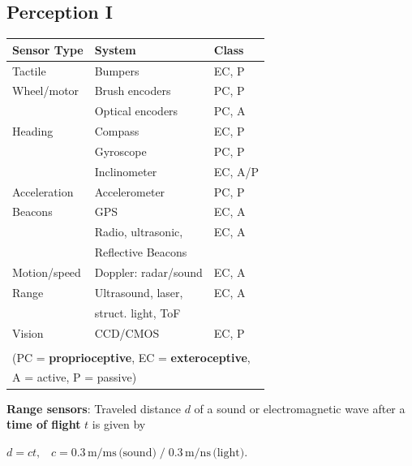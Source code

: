 \documentclass[landscape]{article}
\newcommand{\vmspace}{\vspace{-7pt}}
\newcommand{\vpspace}{\vspace{5pt}}
\newcommand{\vtspace}{\vspace{-10pt}}
\begin{document}
\begin{multicols}{3}
\vtspace

\section{Perception I}
\vmspace

\begin{minipage}{\columnwidth}
  \begin{center}
    \begin{tabular}{lll}\toprule
      \textbf{Sensor Type} & \textbf{System} & \textbf{Class} \\\hline
      Tactile & Bumpers & EC, P \\
      Wheel/motor & Brush encoders & PC, P \\
      & Optical encoders & PC, A \\
      Heading & Compass & EC, P \\
      & Gyroscope & PC, P \\
      & Inclinometer & EC, A/P \\
      Acceleration & Accelerometer & PC, P \\
      Beacons & GPS & EC, A \\
              & Radio, ultrasonic, & EC, A \\
              & Reflective Beacons \\
      Motion/speed & Doppler: radar/sound & EC, A \\
      Range & Ultrasound, laser, & EC, A \\
            & struct. light, ToF \\
      Vision & CCD/CMOS & EC, P \\
      \bottomrule
      \\[-10pt]
      \multicolumn{3}{l}{(PC = \textbf{proprioceptive}, EC =
      \textbf{exteroceptive},} \\
      \multicolumn{3}{l}{A = active, P = passive)}
    \end{tabular}
  \end{center}
\end{minipage}

\vpspace

\begin{minipage}{\columnwidth}
  \textbf{Range sensors}: Traveled distance $d$ of a sound or electromagnetic
  wave after a \textbf{time of flight} $t$ is given by
  \vmspace
  \begin{center}
    $d=ct,\;\;\; c = 0.3\,\mathrm m / \mathrm{ms}\,\text{(sound)} \; / \;
    0.3\,\mathrm m / \mathrm{ns}\,\text{(light)}.$
  \end{center}
\end{minipage}


\end{multicols}
\end{document}
